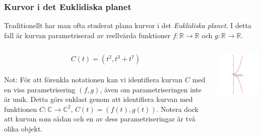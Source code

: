 \documentclass{beamer}
\begin{document}
\begin{frame}
	\frametitle{Kurvor i det Euklidiska planet}
	Traditionellt har man ofta studerat plana kurvor i det \emph{Euklidiska planet}. I detta fall är kurvan parametriserad av reellvärda funktioner $f : \mathbb{R} \rightarrow \mathbb{R}$ och 
	$g : \mathbb{R} \rightarrow \mathbb{R}$.
	
  	\begin{example}
		\begin{columns}[onlytextwidth]
			\begin{column}{0.55\textwidth}
				\[C(t)=(t^2,t^3+t^7)\]\\[10pt]
				\scriptsize Not: För att förenkla notationen kan vi identifiera kurvan $C$ med en viss parametrisering $(f, g)$, även om parametriseringen inte är unik. Detta görs enklast genom att identifiera kurvan med funktionen $C : \mathbb{C} \rightarrow \mathbb{C}^2$, $C(t) = \left(f(t), g(t)\right)$. Notera dock att kurvan som sådan och en av dess parametriseringar är två olika objekt.
			\end{column}
			\begin{column}{0.45\textwidth}
				\begin{center}
				\includegraphics[scale=0.3]{Export/blowupex1_1.png}
				\end{center}
			\end{column}
		\end{columns}
  	\end{example}
\end{frame}
\end{document}
